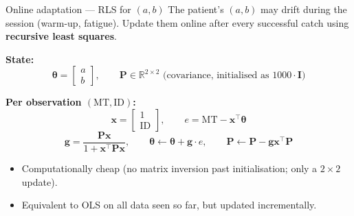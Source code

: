 \documentclass[10pt,aspectratio=169]{beamer}
\begin{document}
\begin{frame}{Online adaptation --- RLS for $(a, b)$}
The patient's $(a, b)$ may drift during the session (warm-up, fatigue). Update them online after every successful catch using \textbf{recursive least squares}.

\textbf{State:}
\[
\boldsymbol{\theta} = \begin{bmatrix} a \\ b \end{bmatrix}, \qquad
\mathbf{P} \in \mathbb{R}^{2 \times 2} \text{ (covariance, initialised as } 1000 \cdot \mathbf{I})
\]

\textbf{Per observation $(\text{MT}, \text{ID})$:}
\[
\mathbf{x} = \begin{bmatrix} 1 \\ \text{ID} \end{bmatrix}, \qquad
e = \text{MT} - \mathbf{x}^\top \boldsymbol{\theta}
\]
\[
\mathbf{g} = \frac{\mathbf{P}\mathbf{x}}{1 + \mathbf{x}^\top \mathbf{P} \mathbf{x}}, \qquad
\boldsymbol{\theta} \leftarrow \boldsymbol{\theta} + \mathbf{g} \cdot e, \qquad
\mathbf{P} \leftarrow \mathbf{P} - \mathbf{g} \mathbf{x}^\top \mathbf{P}
\]

\begin{itemize}
    \item Computationally cheap (no matrix inversion past initialisation; only a $2 \times 2$ update).
    \item Equivalent to OLS on all data seen so far, but updated incrementally.
\end{itemize}
\end{frame}
\end{document}
